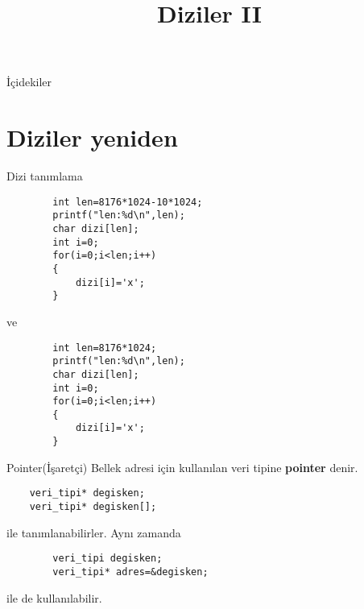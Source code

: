 
\title[Ders 5] {Diziler II}

\frame{\titlepage}
\begin{frame}[fragile]{İçidekiler}
    \tableofcontents
\end{frame}
\section{Diziler yeniden}

\begin{frame}[fragile]{Dizi tanımlama}
    \begin{lstlisting}
        int len=8176*1024-10*1024;
        printf("len:%d\n",len);
        char dizi[len];
        int i=0;
        for(i=0;i<len;i++)
        {
            dizi[i]='x';
        }\end{lstlisting}
    ve
    \begin{lstlisting}
        int len=8176*1024;
        printf("len:%d\n",len);
        char dizi[len];
        int i=0;
        for(i=0;i<len;i++)
        {
            dizi[i]='x';
        }\end{lstlisting}
\end{frame}
\begin{frame}[fragile]{Pointer(İşaretçi)}
    Bellek adresi için kullanılan veri tipine \textbf{pointer} denir.
    \begin{lstlisting}
    veri_tipi* degisken;    
    veri_tipi* degisken[];\end{lstlisting}
    ile tanımlanabilirler. Aynı zamanda
    \begin{lstlisting}
        veri_tipi degisken;    
        veri_tipi* adres=&degisken;\end{lstlisting}
    ile de kullanılabilir.
\end{frame}

